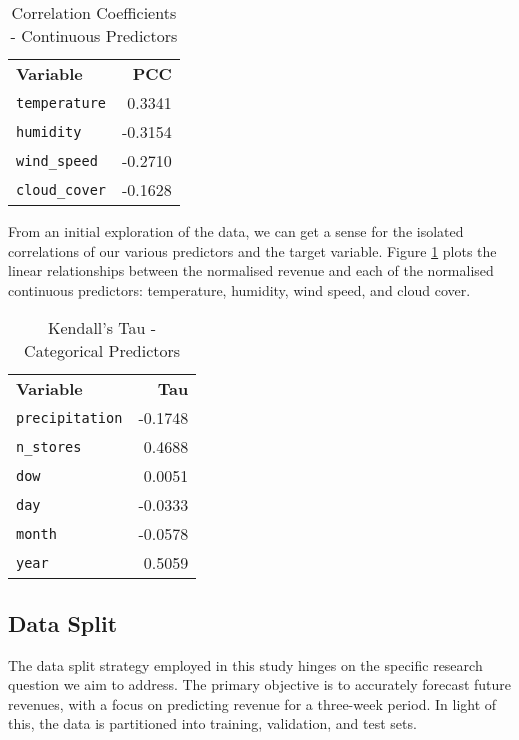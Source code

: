 \begin{table}[h]
\centering
\caption{Correlation Coefficients - Continuous Predictors}
\label{tab:correlation-numeric}
\begin{tabular}{@{} >{\arraybackslash}l r @{}}
\textbf{Variable} & \textbf{PCC} \\ \addlinespace[0.1em]
\toprule
\texttt{temperature} & 0.3341 \\
\texttt{humidity} & -0.3154 \\
\texttt{wind\_speed} & -0.2710 \\
\texttt{cloud\_cover} & -0.1628 \\
\bottomrule
\end{tabular}
\end{table}

From an initial exploration of the data, we can get a sense for the isolated
correlations of our various predictors and the target variable. Figure
\ref{tab:correlation-numeric} plots the linear relationships between the
normalised revenue and each of the normalised continuous predictors:
temperature, humidity, wind speed, and cloud cover. 

\begin{table}[h]
\centering
\caption{Kendall's Tau - Categorical Predictors}
\label{tab:correlation-categorical}
\begin{tabular}{@{} >{\arraybackslash}l r @{}}
\textbf{Variable} & \textbf{Tau} \\ \addlinespace[0.1em]
\toprule
\texttt{precipitation} & -0.1748 \\
\texttt{n\_stores} & 0.4688 \\
\texttt{dow} & 0.0051 \\
\texttt{day} & -0.0333 \\
\texttt{month} & -0.0578 \\
\texttt{year} & 0.5059 \\
\bottomrule
\end{tabular}
\end{table}

\subsection{Data Split}
The data split strategy employed in this study hinges on the specific research
question we aim to address. The primary objective is to accurately forecast
future revenues, with a focus on predicting revenue for a three-week period. In
light of this, the data is partitioned into training, validation, and test
sets.

